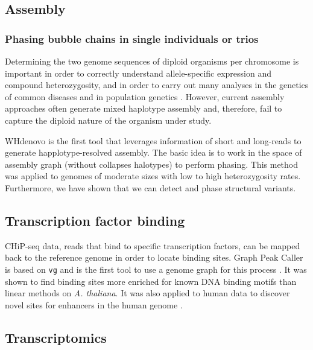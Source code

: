 \subsection{Assembly}

\subsubsection{Phasing bubble chains in single individuals or trios}

Determining the two genome sequences of diploid organisms per chromosome is important in order to correctly understand allele-specific expression and compound heterozygosity, and in order to carry out many analyses in the genetics of common diseases and in population genetics \cite{tewhey2011importance}. 
However, current assembly approaches often generate mixed haplotype assembly and, therefore, fail to capture the diploid nature of the organism under study. 

WHdenovo \cite{garg2019trio, garg2018graph} is the first tool that leverages information of short and long-reads to generate happlotype-resolved assembly. 
The basic idea is to work in the space of assembly graph (without collapses halotypes) to perform phasing. 
This method was applied to genomes of moderate sizes with low to high heterozygosity rates. 
Furthermore, we have shown that we can detect and phase structural variants.

\subsection{Transcription factor binding}

CHiP-seq data, reads that bind to specific transcription factors, can be mapped back to the reference genome in order to locate binding sites.
Graph Peak Caller is based on \texttt{vg} and is the first tool to use a genome graph for this process \cite{Grytten_2019}.
It was shown to find binding sites more enriched for known DNA binding motifs than linear methods on \emph{A. thaliana}.
It was also applied to human data to discover novel sites for enhancers in the human genome \cite{groza2019personalized}. 


\subsection{Transcriptomics}

